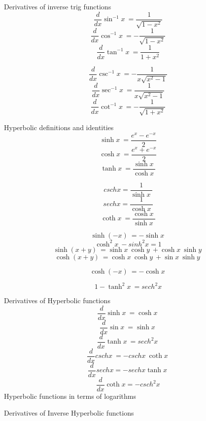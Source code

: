 \documentclass{book}
\title {}
\author{}
\date{}
\begin{document}
\center Derivatives of inverse trig functions
\raggedleft \[ \frac{d}{dx} \sin^{-1}{x}\ = \frac{1}{\sqrt{1-x^2}} \]
\[ \frac{d}{dx} \cos^{-1}{x}\ = -\frac{1}{\sqrt{1-x^2}} \]
\[ \frac{d}{dx} \tan^{-1}{x}\ = \frac{1}{1+x^2} \]

\raggedright
\[ \frac{d}{dx} \csc^{-1}{x}\ = -\frac{1}{x \sqrt{x^2-1}} \]
\[ \frac{d}{dx} \sec^{-1}{x}\ = \frac{1}{x \sqrt{x^2-1}} \]
\[ \frac{d}{dx} \cot^{-1}{x}\ = -\frac{1}{\sqrt{1+x^2}} \]

Hyperbolic definitions and identities
\[\sinh{x}\ = \frac{e^x - e^{-x}}{2}\]
\[\cosh{x}\ = \frac{e^x + e^{-x}}{2}\]
\[\tanh{x}\ = \frac{ \sinh{x}\ }{ \cosh{x}\ }\]

\[csch{x} = \frac{1}{\sinh{x}\ }\]
\[sech{x} = \frac{1}{\cosh{x}\ }\]
\[\coth{x}\ = \frac{\cosh{x}\ }{\sinh{x}\ } \]

\[\sinh{(-x)}\ = -\sinh{x}\ \]
\[\cosh^2{x}\ - sinh^2{x} = 1 \]
\[\sinh{(x+y)}\ = \sinh{x}\ \cosh{y}\ + \cosh{x}\ \sinh{y}\ \]
\[\cosh{(x+y)}\ = \cosh{x}\ \cosh{y}\ + \sin{x}\ \sinh{y}\ \]

\[\cosh{(-x)}\ = -\cosh{x}\ \]

\[1 - \tanh^2{x}\ = sech^2{x}\]

Derivatives of Hyperbolic functions
\[ \frac{d}{dx} \sinh{x}\ = \cosh{x}\ \]
\[ \frac{d}{dx} \sin{x}\ = \sinh{x}\ \]
\[ \frac{d}{dx} \tanh{x}\ = sech^2{x}\ \]
\[ \frac{d}{dx} csch{x}\ = -csch{x}\ \coth{x}\ \]
\[ \frac{d}{dx} sech{x} = -sech{x} \tanh{x}\ \]
\[ \frac{d}{dx} \coth{x} = -csch^2{x}\]
Hyperbolic functions in terms of logarithms

Derivatives of Inverse Hyperbolic functions 
\end{document}
